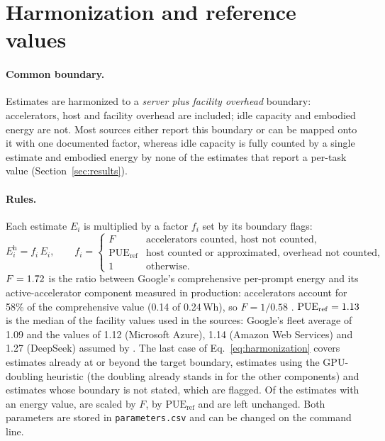 \documentclass[11pt]{article}
\newcommand{\file}[1]{\texttt{#1}}
\newcommand{\Wh}{\,Wh}
\begin{document}
\section{Harmonization and reference values}
\label{sec:harmonization}

\paragraph{Common boundary.}
Estimates are harmonized to a \emph{server plus facility overhead} boundary: accelerators, host and facility overhead are included; idle capacity and embodied energy are not. Most sources either report this boundary or can be mapped onto it with one documented factor, whereas idle capacity is fully counted by a single estimate and embodied energy by none of the estimates that report a per-task value (Section~\ref{sec:results}).

\paragraph{Rules.}
Each estimate $E_i$ is multiplied by a factor $f_i$ set by its boundary flags:
\begin{equation}
  E^{\mathrm{h}}_i = f_i\,E_i, \qquad
  f_i =
  \begin{cases}
    F & \text{accelerators counted, host not counted,}\\
    \mathrm{PUE}_{\mathrm{ref}} & \text{host counted or approximated, overhead not counted,}\\
    1 & \text{otherwise.}
  \end{cases}
  \label{eq:harmonization}
\end{equation}
$F=1.72$ is the ratio between Google's comprehensive per-prompt energy and its active-accelerator component measured in production: accelerators account for 58\% of the comprehensive value (0.14 of 0.24\Wh), so $F = 1/0.58$ \citep{elsworth2025measuring}. $\mathrm{PUE}_{\mathrm{ref}}=1.13$ is the median of the facility values used in the sources: Google's fleet average of 1.09 \citep{elsworth2025measuring} and the values of 1.12 (Microsoft Azure), 1.14 (Amazon Web Services) and 1.27 (DeepSeek) assumed by \citet{jegham2025hungry}. The last case of Eq.~\eqref{eq:harmonization} covers estimates already at or beyond the target boundary, estimates using the GPU-doubling heuristic (the doubling already stands in for the other components) and estimates whose boundary is not stated, which are flagged. Of the \nEstEnergy{} estimates with an energy value, \nFacc{} are scaled by $F$, \nFpue{} by $\mathrm{PUE}_{\mathrm{ref}}$ and \nFone{} are left unchanged. Both parameters are stored in \file{parameters.csv} and can be changed on the command line.
\end{document}
